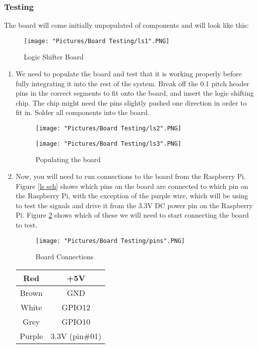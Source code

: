\documentclass[12pt]{article}
\begin{document}
\subsubsection{Testing}

The board will come initially unpopulated of components and will look like this:

\begin{figure}[H]
  	\centering
    	\texttt{[image: "Pictures/Board Testing/ls1".PNG]}
 	\caption{Logic Shifter Board}
	\label{ls1}
\end{figure}

\begin{enumerate}

	\item We need to populate the board and test that it is working properly before fully integrating it into the rest of the system. Break off the 0.1 pitch header pins in the correct segments to fit onto the board, and insert the logic shifting chip. The chip might need the pins slightly pushed one direction in order to fit in. Solder all components into the board.

\begin{figure}[H]
 	\centering
  	\begin{minipage}[b]{0.45\textwidth}
		\texttt{[image: "Pictures/Board Testing/ls2".PNG]}
  	\end{minipage}
  	\hfill
  	\begin{minipage}[b]{0.45\textwidth}
    		\texttt{[image: "Pictures/Board Testing/ls3".PNG]}
  	\end{minipage}
	\caption{Populating the board}
\end{figure}

	\item Now, you will need to run connections to the board from the Raspberry Pi. Figure \ref{ls sch} shows which pins on the board are connected to which pin on the Raspberry Pi, with the exception of the purple wire, which will be using to test the signals and drive it from the 3.3V DC power pin on the Raspberry Pi. Figure \ref{ls4} shows which of these we will need to start connecting the board to test.

\begin{figure}[H]
  	\centering
    	\texttt{[image: "Pictures/Board Testing/pins".PNG]}
 	\caption{Board Connections}
	\label{ls4}
\end{figure}

\begin{center}
\begin{tabular}[2]{| c | c |}	
	\hline
	Red & +5V \\ \hline
	Brown & GND \\ \hline
	White & GPIO12 \\ \hline
	Grey & GPIO10 \\ \hline
	Purple & 3.3V (pin\#01) \\ \hline
\end{tabular}	
\end{center}


\end{enumerate}
\end{document}
